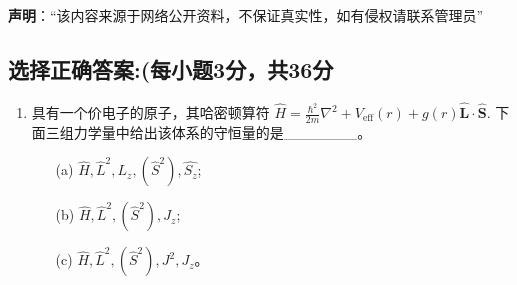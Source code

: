 
\textbf{声明}：“该内容来源于网络公开资料，不保证真实性，如有侵权请联系管理员”

\subsection{选择正确答案:(每小题3分，共36分}
\begin{enumerate}
\item  具有一个价电子的原子，其哈密顿算符 $\hat{H} = \frac{\hbar^2}{2m} \nabla^2 + V_{\text{eff}}(r) + g(r) \mathbf{\hat L} \cdot \mathbf{\hat S}$. 下面三组力学量中给出该体系的守恒量的是_______。
    \begin{itemize}
        \item [(a)] $\hat{H}, \hat{L}^2, L_z, (\hat{S}^2), \hat{S_z}$;
        \item [(b)] $\hat{H}, \hat{L}^2, (\hat{S}^2), J_z$;
        \item [(c)] $\hat{H}, \hat{L}^2, (\hat{S}^2), J^2, J_z$。
    \end{itemize}
\end{enumerate}
